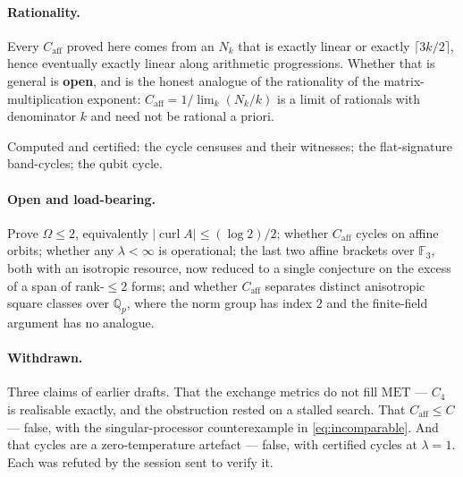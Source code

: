 \documentclass[11pt]{article}
\theoremstyle{plain}
\theoremstyle{remark}
\newcommand{\F}{\mathbb F}
\newcommand{\caff}{C_{\mathrm{aff}}}
\begin{document}
\paragraph{Rationality.}
Every $\caff$ proved here comes from an $N_k$ that is exactly linear or exactly
$\lceil 3k/2 \rceil$, hence eventually exactly linear along arithmetic
progressions.  Whether that is general is \textbf{open}, and is the honest
analogue of the rationality of the matrix-multiplication exponent:
$\caff = 1/\lim_k (N_k/k)$ is a limit of rationals with denominator $k$ and need
not be rational a priori.

Computed and certified: the cycle censuses and their witnesses; the
flat-signature band-cycles; the qubit cycle.

\paragraph{Open and load-bearing.}
Prove $\Omega \le 2$, equivalently $|\operatorname{curl}A| \le (\log 2)/2$;
whether $\caff$ cycles on affine orbits; whether any $\lambda < \infty$ is
operational; the last two affine brackets over $\F_3$, both with an isotropic
resource, now reduced to a single conjecture on the excess of a span of
rank-$\le2$ forms; and whether $\caff$ separates distinct anisotropic square
classes over $\mathbb Q_p$, where the norm group has index $2$ and the
finite-field argument has no analogue.

\paragraph{Withdrawn.}
Three claims of earlier drafts.  That the exchange metrics do not fill
$\mathrm{MET}$ --- $C_4$ is realisable exactly, and the obstruction rested on a
stalled search.  That $\caff \le C$ --- false, with the singular-processor
counterexample in \eqref{eq:incomparable}.  And that cycles are a
zero-temperature artefact --- false, with certified cycles at $\lambda = 1$.
Each was refuted by the session sent to verify it.
\end{document}

